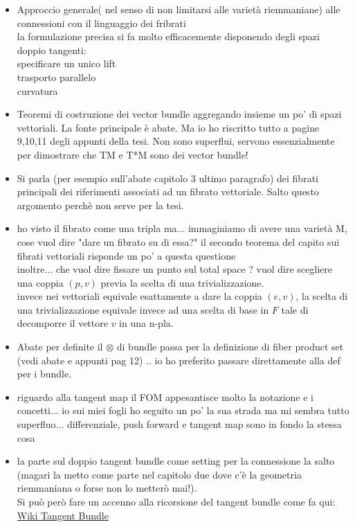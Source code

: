 \documentclass[a4paper,12pt]{scrartcl}    %
\begin{document}
\begin{proposition}
\begin{itemize}
\item Approccio generale( nel senso di non limitarsi alle varietà riemmaniane) alle connessioni con il linguaggio dei fribrati\\ la formulazione precisa si fa molto efficacemente disponendo degli spazi doppio tangenti:
\\	specificare un unico lift
\\	trasporto parallelo
\\	curvatura

\item Teoremi di costruzione dei vector bundle aggregando insieme un po' di spazi vettoriali. La fonte principale è abate. Ma io ho riscritto tutto a pagine 9,10,11 degli appunti della tesi.
Non sono superflui, servono essenzialmente per dimostrare che TM e T*M sono dei vector bundle!

\item Si parla (per esempio sull'abate capitolo 3 ultimo paragrafo) dei fibrati principali dei riferimenti associati ad un fibrato vettoriale. Salto questo argomento perchè non serve per la tesi.

\item ho visto il fibrato come una tripla ma... immaginiamo di avere una varietà M, cose vuol dire "dare un fibrato su di essa?" il secondo teorema del capito sui fibrati vettoriali risponde un po' a questa questione
\\ inoltre... che vuol dire fissare un punto sul total space ? vuol dire scegliere una coppia $(p,v)$ previa la scelta di una trivializzazione.
\\ invece nei vettoriali equivale esattamente a dare la coppia $(e,v)$, la scelta  di una trivializzazione equivale invece ad una scelta di base in $F$ tale di decomporre il vettore $v$ in una n-pla.

\item Abate per definite il $\otimes$ di bundle passa per la definizione di fiber product set (vedi abate e appunti pag 12) .. io ho preferito passare direttamente alla def per i bundle.

\item riguardo alla tangent map il FOM appesantisce molto la notazione e i concetti... io sui miei fogli ho seguito un po' la sua strada ma mi sembra tutto superfluo... differenziale, push forward e tangent map sono in fondo la stessa cosa

\item la parte sul doppio tangent bundle come setting per la connessione la salto (magari la metto come parte nel capitolo due dove c'è la geometria riemmaniana o forse non lo metterò mai!).
\\ Si può però fare un accenno alla ricorsione del tangent bundle come fa qui: \href{http://en.wikipedia.org/wiki/Tangent_bundle#Higher-order_tangent_bundles}{Wiki Tangent Bundle}


\end{itemize}
\end{proposition}
\end{document}
